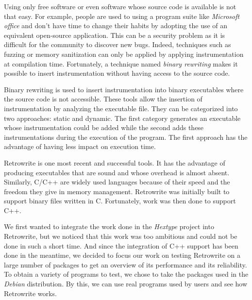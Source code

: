 \documentclass[a4paper,11pt,oneside]{report}
\newcommand{\sysname}{Retrowrite\xspace}
\begin{document}
%
Using only free software or even software whose source code is available is
not that easy. For example, people are used to using a program suite like
\textit{Microsoft office} and don't have time to change their habits by adopting
the use of an equivalent open-source application.  This can be a security
problem as it is difficult for the community to discover new bugs. Indeed,
techniques such as fuzzing or memory sanitization can only be applied by
applying instrumentation at compilation time. Fortunately, a technique named
\textit{binary rewriting} makes it possible to insert instrumentation without
having access to the source code.


Binary rewriting is used to insert instrumentation into
binary executables where the source code is not accessible. These tools allow
the insertion of instrumentation by analyzing the executable file. They can be
categorized into two approaches: static and dynamic. The first category
generates an executable whose instrumentation could be added while the second
adds these instrumentations during the execution of the program. The first
approach has the advantage of having less impact on execution time. 

\sysname is one most recent and successful tools. It has the advantage of
producing executables that are sound and whose overhead is almost absent.
Similarly, C/C++ are widely used languages because of their speed and the
freedom they give in memory management. Retrowrite was initially built to
support binary files written in C. Fortunately, work was then done to support
C++.


We first wanted to integrate the work done in the \textit{Hextype} project into
\sysname, but we noticed that this work was too ambitious and could not be done in
such a short time. And since the integration of C++ support has been done in
the meantime, we decided to focus our work on testing \sysname on a large
number of packages to get an overview of its performance and its  
reliability. To obtain a variety of programs to test, we chose to
take the packages used in the \textit{Debian} distribution. By this, we can use
real programs used by users and see how \sysname works.
\end{document}
